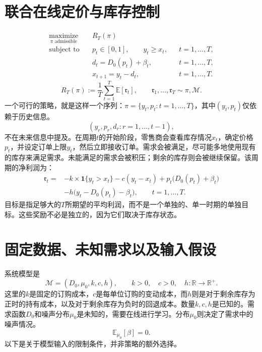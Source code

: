 \documentclass[11pt]{article}
\begin{document}
\section*{联合在线定价与库存控制}

\begin{equation*}
\begin{aligned}
\underset{\pi\text{ admissible}}{\operatorname{maximize}}\quad &R_T(\pi)\\
\text{subject to}\quad
&p_t\in[0,1],\qquad y_t\geq x_t, &&t=1,\ldots,T,\\
&d_t=D_0(p_t)+\beta_t, &&t=1,\ldots,T,\\
&x_{t+1}=y_t-d_t, &&t=1,\ldots,T.
\end{aligned}
\end{equation*}
\begin{equation}
R_T(\pi):=\frac{1}{T}\sum_{t=1}^{T}\mathbb{E}[\mathfrak{r}_t],
\qquad \mathfrak{r}_1,\ldots,\mathfrak{r}_T\sim\pi,\mathcal{M}.
\tag{2}
\end{equation}
一个可行的策略，就是这样一个序列：\(\pi=\{y_t,p_t:t=1,\ldots,T\}\)，其中\((y_t,p_t)\)仅依赖于历史信息。
\[
(y_r,p_r,d_r:r=1,\ldots,t-1),
\]
不在未来信息中提及。在周期\(t\)的开始阶段，零售商会查看库存情况\(x_t\)，确定价格\(p_t\)，并设定订单上限\(y_t\)，然后立即接收订单。需求会被满足，尽可能多地使用现有的库存来满足需求。未能满足的需求会被积压；剩余的库存则会被继续保留。该周期的净利润为：
\begin{equation}
\begin{aligned}
\mathfrak{r}_t={}&-k\times\mathbf{1}\{y_t>x_t\}-c(y_t-x_t)
+p_t\bigl(D_0(p_t)+\beta_t\bigr)\\
&-h\bigl(y_t-D_0(p_t)-\beta_t\bigr),
\qquad t=1,\ldots,T.
\end{aligned}
\tag{1}
\end{equation}
目标是指足够大的\(T\)所期望的平均利润，而不是一个单独的、单一时期的单独目标。这些奖励不必是独立的，因为它们取决于库存状态。

\section*{固定数据、未知需求以及输入假设}
系统模型是
\[
\mathcal{M}=(D_0,\mu_0,k,c,h),\qquad
k>0,\quad c>0,\quad h:\mathbb{R}\longrightarrow\mathbb{R}^{+}.
\]
这里的\(k\)是固定的订购成本，\(c\)是每单位订购的变动成本，而\(h\)则是对于剩余库存为正时的持有成本，以及对于剩余库存为负时的回退成本。数量\(k,c,h\)是已知的。需求函数\(D_0\)和噪声分布\(\mu_0\)是未知的，需要在线进行学习。分布\(\mu_0\)则决定了需求中的噪声情况。
\[
\mathbb{E}_{\mu_0}[\beta]=0.
\]
以下是关于模型输入的限制条件，并非策略的额外选择。
\end{document}
